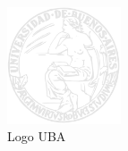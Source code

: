 \begin{figure}
  \includegraphics[width=0.3\textwidth]{logo_uba}
  \caption{Logo UBA}
  \label{fig:logo_uba}
\end{figure}
